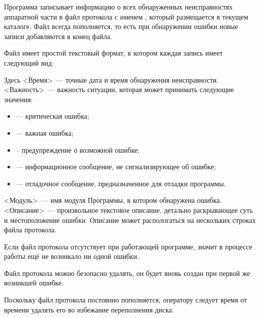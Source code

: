 Программа записывает информацию о всех обнаруженных неисправностях аппаратной части в файл протокола с именем , который размещается в текущем каталоге. Файл всегда пополняется, то есть при обнаружении ошибки новые записи добавляются в конец файла.

Файл имеет простой текстовый формат, в котором каждая запись имеет следующий вид:


Здесь <Время>~--- точные дата и время обнаружения неисправности. <Важность>~--- важность ситуации, которая может принимать следующие значения:

\begin{itemize}
\item {} --- критическая ошибка;
\item {} --- важная ошибка;
\item {} -- предупреждение о возможной ошибке;
\item {} --- информационное сообщение, не сигнализирующее об ошибке;
\item {} --- отладочное сообщение, предназначенное для отладки программы.
\end{itemize}

<Модуль>~--- имя модуля Программы, в котором обнаружена ошибка. <Описание>~--- произвольное текстовое описание, детально раскрывающее суть и местоположение ошибки. Описание может распологаться на нескольких строках файла протокола.

Если файл протокола отсутствует при работающей программе, значит в процессе работы ещё не возникало ни одной ошибки.

Файл протокола можно безопасно удалять, он будет вновь создан при первой же возникшей ошибке.

Поскольку файл протокола постоянно пополняется, оператору следует время от времени удалять его во избежание переполнения диска.
